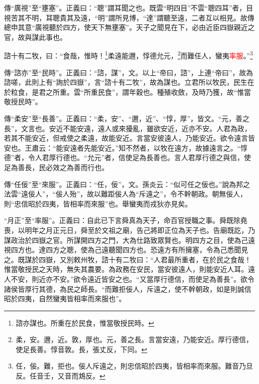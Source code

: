 {\noindent\zhuan{}\fzbyks 傳“廣視”至“壅塞”。正義曰：“聰”謂耳聞之也。既雲“明四目”不雲“聰四耳”者，目視苦其不明，耳聰貴其及遠，“明”謂所見博，“達”謂聽至遠，二者互以相見。故傳總申其意“廣視聽於四方，使天下無壅塞”。天子之聞見在下，必由近臣四嶽親近之官，故與謀此事也。 \par}

諮十有二牧，曰：“食哉，惟時！\footnote{諮亦謀也。所重在於民食，惟當敬授民時。}柔遠能邇，惇德允元，\footnote{柔，安。邇，近。敦，厚也。元，善之長。言當安遠，乃能安近。厚行德信，使足長善。惇音敦。長，張丈反，下同。}而難任人，蠻夷\textcolor{red}{率服}。”\footnote{任，佞。難，拒也。佞人斥遠之，則忠信昭於四夷，皆相率而來服。難音乃旦反。任音壬，又音而鴆反。}

{\noindent\zhuan{}\fzbyks 傳“諮亦”至“民時”。正義曰：“諮，謀”，文。以上“帝曰，諮”，上連“帝曰”，故為諮嗟，此則上有“詢於四嶽”，言“諮十有二牧”，故為謀也。立君所以牧民，民生在於粒食，是君之所重。雲“所重民食”，謂年穀也。種殖收斂，及時乃獲，故“惟當敬授民時”。 \par}

{\noindent\zhuan{}\fzbyks 傳“柔安”至“長善”。正義曰：“柔，安”、“邇，近”、“惇，厚”，皆文。“元，善之長”，文言也。安近不能安遠，遠人或來擾亂，雖欲安近，近亦不安。人君為政，若其不能安近，但戒使之柔遠，故能安近。言當安彼遠人，乃能安近。欲令遠言皆安也。王肅云：“能安遠者先能安近。”知不然者，以牧在遠方，故據遠言之。“惇德”者，令人君厚行德也。“允元”者，信使足為長善也。言人君厚行德之與信，使足為善長，民必效之為善而行也。 \par}

{\noindent\zhuan{}\fzbyks 傳“任佞”至“來服”。正義曰：“任，佞”，文。孫炎云：“似可任之佞也。”說為邦之法雲“遠佞人”，“佞人殆”，故以難距佞人為“斥遠之”，令不幹朝政。朝無佞人，則“忠信昭於四夷，皆相率而來服”也。舉蠻夷而戎狄亦見矣。 \par}

{\noindent\shu{}\fzkt “月正”至“率服”。正義曰：自此已下言舜真為天子，命百官授職之事。舜既除堯喪，以明年之月正元日，舜至於文祖之廟，告己將即正位為天子也。告廟既訖，乃謀政治於四嶽之官。所謀開四方之門，大為仕路致眾賢也。明四方之目，使為己遠視四方也。達四方之聰，使為己遠聽聞四方也。恐遠方有所擁塞，令為己悉聞見之。既謀於四嶽，又別敕州牧，諮十有二牧曰：“人君最所重者，在於民之食哉！惟當敬授民之天時，無失其農要。為政務在安民，當安彼遠人，則能安近人耳。遠人不安，則近亦不安。”欲令遠近皆安之也。“又當厚行德信，而使足為善長”。欲令諸侯皆厚行其德，為民之師長。“而難拒佞人，斥遠之，使不幹朝政，如是則誠信昭於四夷，自然蠻夷皆相率而來服也”。 \par}

